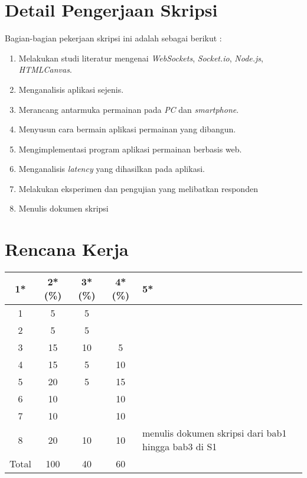 \documentclass[a4paper,twoside]{article}
\begin{document}
\section{Detail Pengerjaan Skripsi}


Bagian-bagian pekerjaan skripsi ini adalah sebagai berikut :
	
	\begin{enumerate}
		\item Melakukan studi literatur mengenai \textit{WebSockets}, \textit{Socket.io}, \textit{Node.js}, \textit{HTMLCanvas}.
		\item Menganalisis aplikasi sejenis.
		\item Merancang antarmuka permainan pada \textit{PC} dan \textit{smartphone}.
		\item Menyusun cara bermain aplikasi permainan yang dibangun.
		\item Mengimplementasi program aplikasi permainan berbasis web.
		\item Menganalisis \textit{latency} yang dihasilkan pada aplikasi.
		\item Melakukan eksperimen dan pengujian yang melibatkan responden 
		\item Menulis dokumen skripsi
	\end{enumerate}

\section{Rencana Kerja}

\begin{center}
  \begin{tabular}{ | c | c | c | c | l |}
    \hline
    1*  & 2*(\%) & 3*(\%) & 4*(\%) &5*\\ \hline \hline
    1 & 5 & 5 & & \\ \hline
    2 & 5 & 5 & & \\ \hline
    3 & 15 & 10 & 5 & \\ \hline
    4 & 15 & 5 & 10 & \\ \hline
    5 & 20 & 5 & 15 & \\ \hline
    6 & 10 &   & 10 & \\ \hline
    7 & 10 &  & 10 & \\ \hline
    8 & 20 & 10 & 10 & {\footnotesize menulis dokumen skripsi dari bab1 hingga bab3 di S1} \\ \hline
    Total & 100 & 40 & 60 & \\ \hline
                          \end{tabular}
\end{center}
\end{document}
